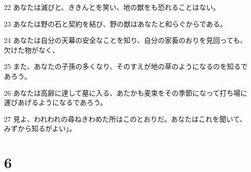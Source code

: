 \par 22 あなたは滅びと、ききんとを笑い、地の獣をも恐れることはない。
\par 23 あなたは野の石と契約を結び、野の獣はあなたと和らぐからである。
\par 24 あなたは自分の天幕の安全なことを知り、自分の家畜のおりを見回っても、欠けた物がなく、
\par 25 また、あなたの子孫の多くなり、そのすえが地の草のようになるのを知るであろう。
\par 26 あなたは高齢に達して墓に入る、あたかも麦束をその季節になって打ち場に運びあげるようになるであろう。
\par 27 見よ、われわれの尋ねきわめた所はこのとおりだ。あなたはこれを聞いて、みずから知るがよい」。

\chapter{6}

